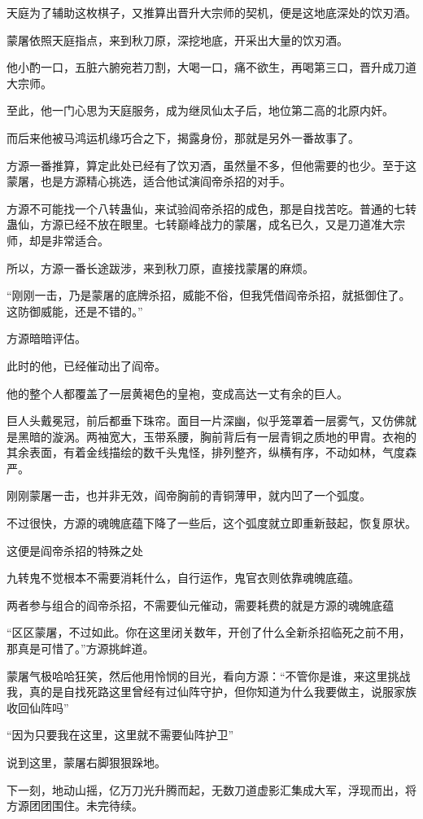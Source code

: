 \begin{this_body}
天庭为了辅助这枚棋子，又推算出晋升大宗师的契机，便是这地底深处的饮刃酒。

蒙屠依照天庭指点，来到秋刀原，深挖地底，开采出大量的饮刃酒。

他小酌一口，五脏六腑宛若刀割，大喝一口，痛不欲生，再喝第三口，晋升成刀道大宗师。

至此，他一门心思为天庭服务，成为继凤仙太子后，地位第二高的北原内奸。

而后来他被马鸿运机缘巧合之下，揭露身份，那就是另外一番故事了。

方源一番推算，算定此处已经有了饮刃酒，虽然量不多，但他需要的也少。至于这蒙屠，也是方源精心挑选，适合他试演阎帝杀招的对手。

方源不可能找一个八转蛊仙，来试验阎帝杀招的成色，那是自找苦吃。普通的七转蛊仙，方源已经不放在眼里。七转巅峰战力的蒙屠，成名已久，又是刀道准大宗师，却是非常适合。

所以，方源一番长途跋涉，来到秋刀原，直接找蒙屠的麻烦。

“刚刚一击，乃是蒙屠的底牌杀招，威能不俗，但我凭借阎帝杀招，就抵御住了。这防御威能，还是不错的。”

方源暗暗评估。

此时的他，已经催动出了阎帝。

他的整个人都覆盖了一层黄褐色的皇袍，变成高达一丈有余的巨人。

巨人头戴冕冠，前后都垂下珠帘。面目一片深幽，似乎笼罩着一层雾气，又仿佛就是黑暗的漩涡。两袖宽大，玉带系腰，胸前背后有一层青铜之质地的甲胄。衣袍的其余表面，有着金线描绘的数千头鬼怪，排列整齐，纵横有序，不动如林，气度森严。

刚刚蒙屠一击，也并非无效，阎帝胸前的青铜薄甲，就内凹了一个弧度。

不过很快，方源的魂魄底蕴下降了一些后，这个弧度就立即重新鼓起，恢复原状。

这便是阎帝杀招的特殊之处

九转鬼不觉根本不需要消耗什么，自行运作，鬼官衣则依靠魂魄底蕴。

两者参与组合的阎帝杀招，不需要仙元催动，需要耗费的就是方源的魂魄底蕴

“区区蒙屠，不过如此。你在这里闭关数年，开创了什么全新杀招临死之前不用，那真是可惜了。”方源挑衅道。

蒙屠气极哈哈狂笑，然后他用怜悯的目光，看向方源：“不管你是谁，来这里挑战我，真的是自找死路这里曾经有过仙阵守护，但你知道为什么我要做主，说服家族收回仙阵吗”

“因为只要我在这里，这里就不需要仙阵护卫”

说到这里，蒙屠右脚狠狠跺地。

下一刻，地动山摇，亿万刀光升腾而起，无数刀道虚影汇集成大军，浮现而出，将方源团团围住。未完待续。

\end{this_body}


